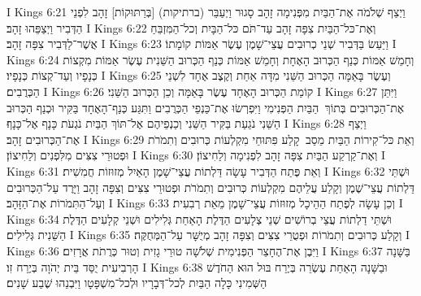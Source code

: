 I Kings 6:21	וַיְצַף שְׁלֹמֹה אֶת־הַבַּיִת מִפְּנִימָה זָהָב סָגוּר וַיְעַבֵּר (ברתיקות) [בְּרַתּוּקוֹת] זָהָב לִפְנֵי הַדְּבִיר וַיְצַפֵּהוּ זָהָב׃
I Kings 6:22	וְאֶת־כּל־הַבַּיִת צִפָּה זָהָב עַד־תֹּם כּל־הַבָּיִת וְכל־הַמִּזְבֵּחַ אֲשֶׁר־לַדְּבִיר צִפָּה זָהָב׃
I Kings 6:23	וַיַּעַשׂ בַּדְּבִיר שְׁנֵי כְרוּבִים עֲצֵי־שָׁמֶן עֶשֶׂר אַמּוֹת קוֹמָתוֹ׃
I Kings 6:24	וְחָמֵשׁ אַמּוֹת כְּנַף הַכְּרוּב הָאֶחָת וְחָמֵשׁ אַמּוֹת כְּנַף הַכְּרוּב הַשֵּׁנִית עֶשֶׂר אַמּוֹת מִקְצוֹת כְּנָפָיו וְעַד־קְצוֹת כְּנָפָיו׃
I Kings 6:25	וְעֶשֶׂר בָּאַמָּה הַכְּרוּב הַשֵּׁנִי מִדָּה אַחַת וְקֶצֶב אֶחָד לִשְׁנֵי הַכְּרֻבִים׃
I Kings 6:26	קוֹמַת הַכְּרוּב הָאֶחָד עֶשֶׂר בָּאַמָּה וְכֵן הַכְּרוּב הַשֵּׁנִי׃
I Kings 6:27	וַיִּתֵּן אֶת־הַכְּרוּבִים בְּתוֹךְ  הַבַּיִת הַפְּנִימִי וַיִּפְרְשׂוּ אֶת־כַּנְפֵי הַכְּרֻבִים וַתִּגַּע כְּנַף־הָאֶחָד בַּקִּיר וּכְנַף הַכְּרוּב הַשֵּׁנִי נֹגַעַת בַּקִּיר הַשֵּׁנִי וְכַנְפֵיהֶם אֶל־תּוֹךְ הַבַּיִת נֹגְעֹת כָּנָף אֶל־כָּנָף׃
I Kings 6:28	וַיְצַף אֶת־הַכְּרוּבִים זָהָב׃
I Kings 6:29	וְאֵת כּל־קִירוֹת הַבַּיִת מֵסַב  קָלַע פִּתּוּחֵי מִקְלְעוֹת כְּרוּבִים וְתִמֹרֹת וּפְטוּרֵי צִצִּים מִלִּפְנִים וְלַחִיצוֹן׃
I Kings 6:30	וְאֶת־קַרְקַע הַבַּיִת צִפָּה זָהָב לִפְנִימָה וְלַחִיצוֹן׃
I Kings 6:31	וְאֵת פֶּתַח הַדְּבִיר עָשָׂה דַּלְתוֹת עֲצֵי־שָׁמֶן הָאַיִל מְזוּזוֹת חֲמִשִׁית׃
I Kings 6:32	וּשְׁתֵּי דַּלְתוֹת עֲצֵי־שֶׁמֶן וְקָלַע עֲלֵיהֶם מִקְלְעוֹת כְּרוּבִים וְתִמֹרֹת וּפְטוּרֵי צִצִּים וְצִפָּה זָהָב וַיָּרֶד עַל־הַכְּרוּבִים וְעַל־הַתִּמֹרוֹת אֶת־הַזָּהָב׃
I Kings 6:33	וְכֵן עָשָׂה לְפֶתַח הַהֵיכָל מְזוּזוֹת עֲצֵי־שָׁמֶן מֵאֵת רְבִעִית׃
I Kings 6:34	וּשְׁתֵּי דַלְתוֹת עֲצֵי בְרוֹשִׁים שְׁנֵי צְלָעִים הַדֶּלֶת הָאַחַת גְּלִילִים וּשְׁנֵי קְלָעִים הַדֶּלֶת הַשֵּׁנִית גְּלִילִים׃
I Kings 6:35	וְקָלַע כְּרוּבִים וְתִמֹרוֹת וּפְטֻרֵי צִצִּים וְצִפָּה זָהָב מְיֻשָּׁר עַל־הַמְּחֻקֶּה׃
I Kings 6:36	וַיִּבֶן אֶת־הֶחָצֵר הַפְּנִימִית שְׁלֹשָׁה טוּרֵי גָזִית וְטוּר כְּרֻתֹת אֲרָזִים׃
I Kings 6:37	בַּשָּׁנָה הָרְבִיעִית יֻסַּד בֵּית יְהֹוָה בְּיֶרַח זִו׃
I Kings 6:38	וּבַשָּׁנָה הָאַחַת עֶשְׂרֵה בְּיֶרַח בּוּל הוּא הַחֹדֶשׁ הַשְּׁמִינִי כָּלָה הַבַּיִת לְכל־דְּבָרָיו וּלְכל־מִשְׁפָּטָו וַיִּבְנֵהוּ שֶׁבַע שָׁנִים׃
